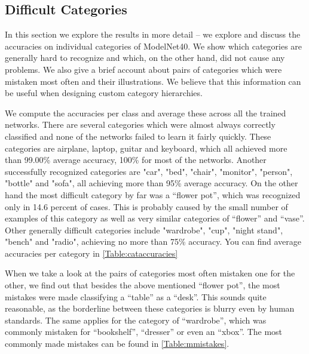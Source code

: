 \subsection{Difficult Categories}
In this section we explore the results in more detail -- we explore and discuss the accuracies on individual categories of ModelNet40. We show which categories are generally hard to recognize and which, on the other hand, did not cause any problems. We also give a brief account about pairs of categories which were mistaken most often and their illustrations. We believe that this information can be useful when designing custom category hierarchies. \par
We compute the accuracies per class and average these across all the trained networks. There are several categories which were almost always correctly classified and none of the networks failed to learn it fairly quickly. These categories are airplane, laptop, guitar and keyboard, which all achieved more than 99.00\% average accuracy, 100\% for most of the networks. Another successfully recognized categories are "car", "bed", "chair", "monitor", "person", "bottle" and "sofa", all achieving more than 95\% average accuracy.  
On the other hand the most difficult category by far was a “flower pot”, which was recognized only in 14.6 percent of cases. This is probably caused by the small number of examples of this category as well as very similar categories of “flower” and “vase”. Other generally difficult categories include "wardrobe", "cup", "night stand", "bench" and "radio", achieving no more than 75\% accuracy. You can find average accuracies per category in \autoref{Table:cataccuracies} \par



When we take a look at the pairs of categories most often mistaken one for the other, we find out that besides the above mentioned “flower pot”, the most mistakes were made classifying a “table” as a “desk”. This sounds quite reasonable, as the borderline between these categories is blurry even by human standards. The same applies for the category of “wardrobe”, which was commonly mistaken for “bookshelf”, “dresser” or even an “xbox”. The most commonly made mistakes can be found in \autoref{Table:mmistakes}.





